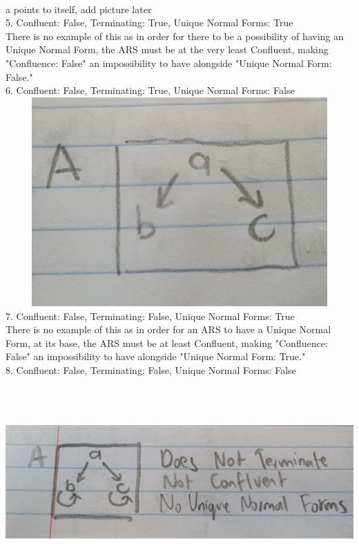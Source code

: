 \documentclass{article}
\theoremstyle{theorem}
\theoremstyle{definition}
\theoremstyle{remark}
\begin{document}
\\ a points to itself, add picture later
\\ 5. Confluent: False, Terminating: True, Unique Normal Forms: True
\\ There is no example of this as in order for there to be a possibility of having an Unique Normal Form, the ARS must be at the very least Confluent, making "Confluence: False" an impossibility to have alongside "Unique Normal Form: False."
\\ 6. Confluent: False, Terminating: True, Unique Normal Forms: False
\\ \includegraphics[width=15cm, height=8cm]{Report Images/week7_11.jpg}
\\ 7. Confluent: False, Terminating: False, Unique Normal Forms: True
\\ There is no example of this as in order for an ARS to have a Unique Normal Form, at its base, the ARS must be at least Confluent, making "Confluence: False" an impossibility to have alongside "Unique Normal Form: True."
\\ 8. Confluent: False, Terminating: False, Unique Normal Forms: False
\\ \includegraphics[width=15cm, height=8cm]{Report Images/week7_7.jpg}
\end{document}
